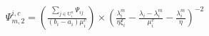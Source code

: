 \documentclass[conference]{IEEEtran}
\begin{document}
\begin{equation}
    \begin{aligned}
        \Psi_{m,2}^{i, c} = (\frac{\sum_{j \in \mathrm{U}_i^n}\Psi_{ij}}{(b_i-a_i)\mu_i^v}) \times (\frac{\lambda_i^m}{\eta\xi_i} - \frac{\lambda_i - \lambda_i^m}{\mu_i^v} - \frac{\lambda_i^m}{\eta})^{-2}
    \end{aligned}
\end{equation}




\end{document}
